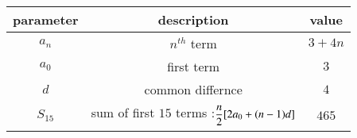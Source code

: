 \begin{tabular}{|c|c|c|}
\hline
     \textbf{parameter} & \textbf{description} & \textbf{value} \\
     \hline
     $a_n$ & $n^{th}$ term & $3 + 4n$ \\
     \hline
     $a_0$ & first term & $3$\\
     \hline
     $d$ & common differnce & $4$ \\
     \hline
     $S_{15}$ &  sum of first $15$ terms :$\dfrac{n}{2\vphantom{\brak{0.1}}} [2a_0 + (n-1)d]$ & $465$ \\
     \hline
\end{tabular}
